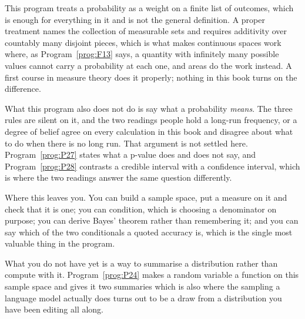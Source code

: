 \begin{fr}
\begin{rigourbox}
This program treats a probability as a weight on a finite list of outcomes,
which is enough for everything in it and is not the general definition. A
proper treatment names the collection of measurable sets and requires
additivity over countably many disjoint pieces, which is what makes continuous
spaces work \dash{} where, as Program~\ref{prog:F13} says, a quantity with
infinitely many possible values cannot carry a probability at each one, and
areas do the work instead. A first course in measure theory
does it properly; nothing in this book turns on the difference.

What this program also does not do is say what a probability \emph{means}.
The three rules are silent on it, and the two readings people hold \dash{} a
long-run frequency, or a degree of belief \dash{} agree on every calculation in
this book and disagree about what to do when there is no long run. That
argument is not settled here. Program~\ref{prog:P27} states what a p-value does
and does not say, and Program~\ref{prog:P28} contrasts a credible interval with
a confidence interval, which is where the two readings answer the same question
differently.
\end{rigourbox}
\end{fr}

\begin{fr}
Where this leaves you. You can build a sample space, put a measure on it and
check that it is one; you can condition, which is choosing a denominator on
purpose; you can derive Bayes' theorem rather than remembering it; and you can
say which of the two conditionals a quoted accuracy is, which is the single
most valuable thing in the program.

What you do not have yet is a way to summarise a distribution rather than
compute with it. Program~\ref{prog:P24} makes a random variable a function on
this sample space and gives it two summaries \dash{} which is also where the
sampling a language model actually does turns out to be a draw from a
distribution you have been editing all along.
\end{fr}

